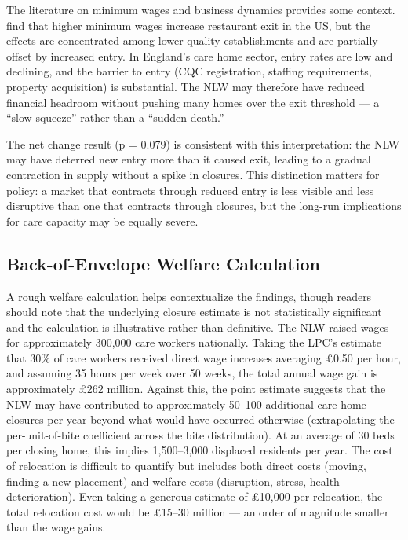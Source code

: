 \documentclass[12pt]{article}
\begin{document}
The literature on minimum wages and business dynamics provides some context. \citet{aaronson2018industry} find that higher minimum wages increase restaurant exit in the US, but the effects are concentrated among lower-quality establishments and are partially offset by increased entry. In England's care home sector, entry rates are low and declining, and the barrier to entry (CQC registration, staffing requirements, property acquisition) is substantial. The NLW may therefore have reduced financial headroom without pushing many homes over the exit threshold --- a ``slow squeeze'' rather than a ``sudden death.''

The net change result (p = 0.079) is consistent with this interpretation: the NLW may have deterred new entry more than it caused exit, leading to a gradual contraction in supply without a spike in closures. This distinction matters for policy: a market that contracts through reduced entry is less visible and less disruptive than one that contracts through closures, but the long-run implications for care capacity may be equally severe.

\subsection{Back-of-Envelope Welfare Calculation}

A rough welfare calculation helps contextualize the findings, though readers should note that the underlying closure estimate is not statistically significant and the calculation is illustrative rather than definitive. The NLW raised wages for approximately 300,000 care workers nationally. Taking the LPC's estimate that 30\% of care workers received direct wage increases averaging \pounds0.50 per hour, and assuming 35 hours per week over 50 weeks, the total annual wage gain is approximately \pounds262 million. Against this, the point estimate suggests that the NLW may have contributed to approximately 50--100 additional care home closures per year beyond what would have occurred otherwise (extrapolating the per-unit-of-bite coefficient across the bite distribution). At an average of 30 beds per closing home, this implies 1,500--3,000 displaced residents per year. The cost of relocation is difficult to quantify but includes both direct costs (moving, finding a new placement) and welfare costs (disruption, stress, health deterioration). Even taking a generous estimate of \pounds10,000 per relocation, the total relocation cost would be \pounds15--30 million --- an order of magnitude smaller than the wage gains.
\end{document}
